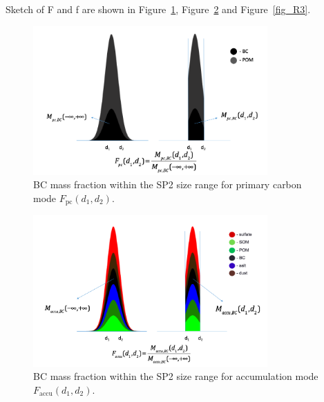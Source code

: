 \documentclass[12pt]{article}
\begin{document}
	Sketch of F and f are shown in Figure~\ref{fig_R1}, Figure~\ref{fig_R2} and Figure~\ref{fig_R3}.
	
	\begin{figure}[H] 
		\begin{center}
			\includegraphics[width = 0.8\textwidth]{Rplot05}
			\caption[]{\label{fig_R1} BC mass fraction within the SP2 size range for primary carbon mode $F_{\text{pc}}(d_{1}, d_{2})$.}
		\end{center}
	\end{figure}
	
	\begin{figure}[H] 
		\begin{center}
			\includegraphics[width = 0.8\textwidth]{Rplot06}
			\caption[]{\label{fig_R2} BC mass fraction within the SP2 size range for accumulation mode $F_{\text{accu}}(d_{1}, d_{2})$.}
		\end{center}
	\end{figure}
	
\end{document}
